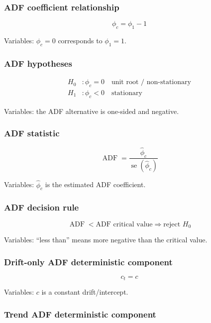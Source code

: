\documentclass[
  8pt,
  twocolumn]{extarticle}
\begin{document}
\subsubsection{ADF coefficient
relationship}\label{adf-coefficient-relationship}

\[
\phi_c=\phi_1-1
\]

Variables: \(\phi_c=0\) corresponds to \(\phi_1=1\).

\subsubsection{ADF hypotheses}\label{adf-hypotheses}

\[
\begin{aligned}
H_0&:\phi_c=0\quad \text{unit root / non-stationary}\\
H_1&:\phi_c<0\quad \text{stationary}
\end{aligned}
\]

Variables: the ADF alternative is one-sided and negative.

\subsubsection{ADF statistic}\label{adf-statistic}

\[
\operatorname{ADF}=\frac{\hat\phi_c}{\operatorname{se}(\hat\phi_c)}
\]

Variables: \(\hat\phi_c\) is the estimated ADF coefficient.

\subsubsection{ADF decision rule}\label{adf-decision-rule}

\[
\operatorname{ADF}<\text{ADF critical value}\Rightarrow \text{reject }H_0
\]

Variables: ``less than'' means more negative than the critical value.

\subsubsection{Drift-only ADF deterministic
component}\label{drift-only-adf-deterministic-component}

\[
c_t=c
\]

Variables: \(c\) is a constant drift/intercept.

\subsubsection{Trend ADF deterministic
component}\label{trend-adf-deterministic-component}
\end{document}
